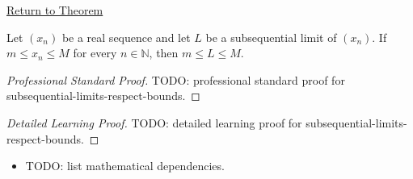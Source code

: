 \newpage
{}
\label{prf:subsequential-limits-respect-bounds}

\begin{remark*}[Return]
\hyperref[thm:subsequential-limits-respect-bounds]{Return to Theorem}
\end{remark*}

\begin{theorem*}
Let $(x_n)$ be a real sequence and let $L$ be a subsequential limit of
$(x_n)$. If $m\le x_n\le M$ for every $n\in\mathbb{N}$, then
$m\le L\le M$.

\smallskip
\noindent
\end{theorem*}

\begin{proof}[Professional Standard Proof]
\LRAProofBodyStart
TODO: professional standard proof for subsequential-limits-respect-bounds.
\end{proof}

\begin{proof}[Detailed Learning Proof]
\LRAProofBodyStart
TODO: detailed learning proof for subsequential-limits-respect-bounds.
\end{proof}

\begin{remark*}
\end{remark*}

\begin{dependencies}
\begin{itemize}
  \item TODO: list mathematical dependencies.
\end{itemize}
\end{dependencies}

\clearpage

